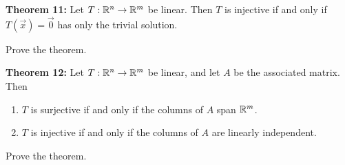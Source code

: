 \documentclass[12pt,letterpaper]{article}
\begin{document}
\begin{enumerate}
\newpage

{\bf Theorem 11:} Let $T: \mathbb{R}^n \to \mathbb{R}^m$ be linear. Then $T$ is injective if and only if $T(\vec{x})=\vec{0}$ has only the trivial solution.

\Problem Prove the theorem.

\vfill 

{\bf Theorem 12:} Let $T: \mathbb{R}^n \to \mathbb{R}^m$ be linear, and let $A$ be the associated matrix. Then 
\begin{enumerate}
\item $T$ is surjective if and only if the columns of $A$ span $\mathbb{R}^m$.
\item $T$ is injective if and only if the columns of $A$ are linearly independent. 
\end{enumerate}

\Problem Prove the theorem.

\vfill 

\end{enumerate}
\end{document}
